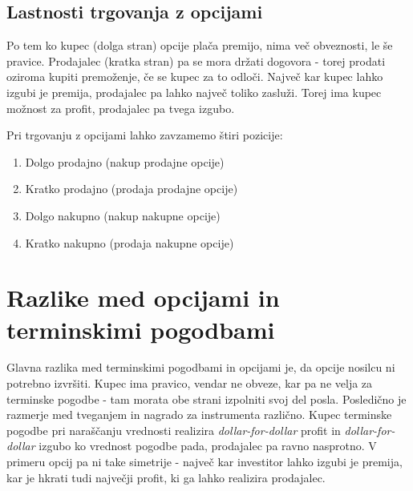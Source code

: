 \documentclass[a4paper]{article}
\begin{document}
\subsection{Lastnosti trgovanja z opcijami}
Po tem ko kupec (dolga stran) opcije plača premijo, nima več obveznosti, le še pravice. Prodajalec (kratka stran) pa se mora držati dogovora - torej prodati
oziroma kupiti premoženje, če se kupec za to odloči. Največ kar kupec lahko izgubi je premija,
prodajalec pa lahko največ toliko zasluži. Torej ima kupec možnost za profit, prodajalec pa tvega izgubo.

Pri trgovanju z opcijami lahko zavzamemo štiri pozicije:
\begin{enumerate}
    \item Dolgo prodajno (nakup prodajne opcije)
    \item Kratko prodajno (prodaja prodajne opcije)
    \item Dolgo nakupno (nakup nakupne opcije)
    \item Kratko nakupno (prodaja nakupne opcije)
\end{enumerate}

\section{Razlike med opcijami in terminskimi pogodbami}
Glavna razlika med terminskimi pogodbami in opcijami je, da opcije nosilcu ni potrebno izvršiti. Kupec ima pravico,
vendar ne obveze, kar pa ne velja za terminske pogodbe - tam morata obe strani izpolniti svoj del posla.
Posledično je razmerje med tveganjem in nagrado za instrumenta različno. Kupec terminske pogodbe pri naraščanju vrednosti
realizira \textit{dollar-for-dollar} profit in \textit{dollar-for-dollar} izgubo ko vrednost pogodbe pada, prodajalec pa ravno nasprotno. V primeru
opcij pa ni take simetrije - največ kar investitor lahko izgubi je premija, kar je hkrati tudi največji profit, ki ga lahko realizira prodajalec.
\end{document}

